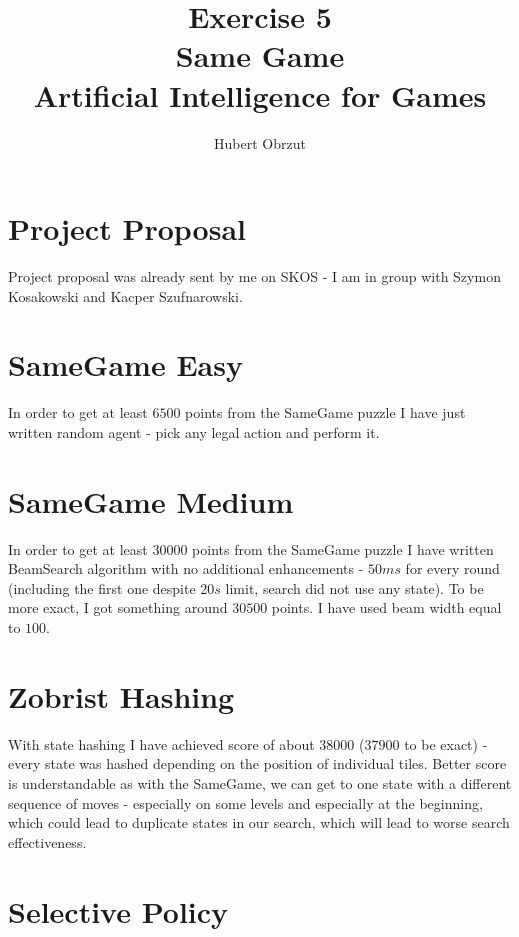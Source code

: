\documentclass[11pt]{article}
\title{
	Exercise 5 \\
	Same Game \\
	Artificial Intelligence for Games \\
}
\author{Hubert Obrzut}
\begin{document}
	\maketitle
	
	\section{Project Proposal}
	Project proposal was already sent by me on SKOS - I am in group with Szymon Kosakowski and Kacper Szufnarowski.
	
	\section{SameGame Easy}
	In order to get at least $6500$ points from the SameGame puzzle I have just written random agent - pick any legal action and perform it.
	
	\section{SameGame Medium}
	In order to get at least $30000$ points from the SameGame puzzle I have written BeamSearch algorithm with no additional enhancements - $50ms$ for every round (including the first one despite $20s$ limit, search did not use any state). To be more exact, I got something around $30500$ points. I have used beam width equal to $100$.
	
	\section{Zobrist Hashing}
	With state hashing I have achieved score of about $38000$ ($37900$ to be exact) - every state was hashed depending on the position of individual tiles. Better score is understandable as with the SameGame, we can get to one state with a different sequence of moves - especially on some levels and especially at the beginning, which could lead to duplicate states in our search, which will lead to worse search effectiveness.
	
	\section{Selective Policy}
	
\end{document}
